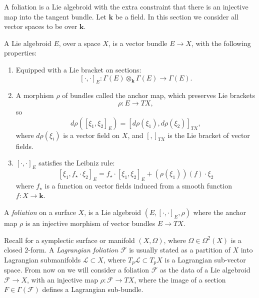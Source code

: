     A foliation is a Lie algebroid with the extra constraint that there is an injective map into the tangent bundle. Let \( \mathbf{k}\) be a field. In this section we consider all vector spaces to be over \( \mathbf{k}\).
    
   \begin{defn}
   A Lie algebroid \(E\), over a space \(X\), is a vector bundle \(E \rightarrow X\),  with the following properties:
   \begin{enumerate}
       \item Equipped with a Lie bracket on sections:
       \[ [\cdot,\cdot]_{E} : \Gamma(E) \otimes_{\mathbf{k}} \Gamma(E) \rightarrow \Gamma(E). \]
       \item A morphism \( \rho\) of bundles called the anchor map, which preserves Lie brackets \[ \rho : E \rightarrow TX,\]
       so 
       \[ d \rho ( [\xi_1, \xi_2 ]_E ) = [d\rho(\xi_1), d \rho(\xi_2) ]_{TX},\]
       where \( d \rho(\xi_i) \) is a vector field on \(X\), and \([,]_{TX}\) is the Lie bracket of vector fields.
       \item \( [\cdot, \cdot]_E\) satisfies the Leibniz rule:
       \[ [\xi_1, f_{\star} \cdot \xi_2 ] _E= f_{\star} \cdot [\xi_1,\xi_2]_E + (\rho(\xi_1))(f) \cdot \xi_2\]
       where \(f_{\star}\) is a function on vector fields induced from a smooth function \( f :  X \rightarrow \mathbf{k}\).
   \end{enumerate}
   \end{defn}
   
    \begin{defn} A \emph{foliation} on a surface \(X\), 
    is a Lie algebroid \((E, [\cdot,\cdot]_E, \rho )\) where the anchor map \( \rho \) is an injective morphism of vector bundles \(E \rightarrow TX \).
    \end{defn}
    
    Recall for a symplectic surface or manifold \((X, \Omega)\), where \( \Omega \in \Omega^2(X) \) is a closed \(2\)-form. A \emph{Lagrangian foliation} \( \mathcal{F}\) is usually stated as a partition of \(X\) into Lagrangian submanifolds \( \mathcal{L} \subset X\), where \(T_p \mathcal{L} \subset T_p X\) is a Lagrangian sub-vector space. From now on we will consider a foliation \( \mathcal{F}\) as the data of a Lie algebroid \( \mathcal{F} \rightarrow X\), with an injective map \( \rho : \mathcal{F} \rightarrow TX\), where the image of a section \(F \in \Gamma(\mathcal{F})\) defines a Lagrangian sub-bundle.
    
    
    \fi 
    
